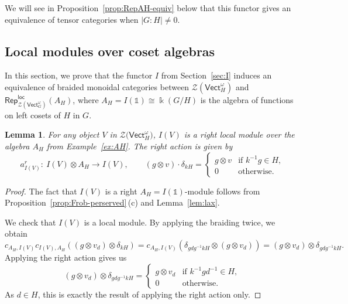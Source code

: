 \documentclass[pdftex]{sigma}
\numberwithin{equation}{section}
\newtheorem{Lemma}[Theorem]{Lemma}
\newcommand{\one}{\mathds{1}}
\newcommand{\locmod}{\mathsf{Rep}^{\mathsf{loc}}}
\newcommand{\Vect}{\mathsf{Vect}}
\newcommand{\cZ}{\mathcal{Z}}
\newcommand{\rI}{I}
\begin{document}
We will see in Proposition~\ref{prop:RepAH-equiv} below that this functor gives an equivalence of tensor categories when $|G:H|\neq 0$.

\subsection{Local modules over coset algebras}

In this section, we prove that the functor $\rI$ from Section~\ref{sec:I} induces an equivalence of braided monoidal categories between
$\cZ( \Vect_H^\omega)$ and $\locmod_{\cZ( \Vect_G^\omega)}(A_H)$, where
$A_H=\rI(\one)\cong \Bbbk(G/H)$ is the algebra of functions on left cosets of $H$ in $G$.

\begin{Lemma}\label{lem:AH-action}
For any object $V$ in $\cZ\big(\Vect_H^\omega\big)$, $\rI(V)$ is a right local module over the algebra $A_H$ from Example~{\rm \ref{ex:AH}}. The right action is given by
\[
a_{\rI(V)}^r\colon\ \rI(V)\otimes A_H\to \rI(V), \qquad (g\otimes v)\cdot \delta_{kH}=
\begin{cases}
g\otimes v & \text{if $k^{-1}g\in H$,}\\
0 & \text{otherwise.}
\end{cases}
\]
\end{Lemma}
\begin{proof}
The fact that $\rI(V)$ is a right $A_H=\rI(\one)$-module follows from Proposition~\ref{prop:Frob-perserved}\,(c) and Lemma~\ref{lem:lax}.

We check that $\rI(V)$ is a local module. By applying the braiding twice, we obtain
\[
c_{A_H,\rI(V)}c_{\rI(V),A_H}((g\otimes v_d)\otimes \delta_{kH}) = c_{A_H,\rI(V)}(\delta_{gdg^{-1}kH} \otimes (g\otimes v_d)) = (g\otimes v_d) \otimes \delta_{gdg^{-1}kH}.
\]
Applying the right action gives us
\[
(g\otimes v_d) \otimes \delta_{gdg^{-1}kH}=
\begin{cases}
g\otimes v_d & \text{if $k^{-1}gd^{-1}\in H$,}\\
0 & \text{otherwise.}
\end{cases}
\]
As $d\in H$, this is exactly the result of applying the right action only.
\end{proof}
\end{document}
